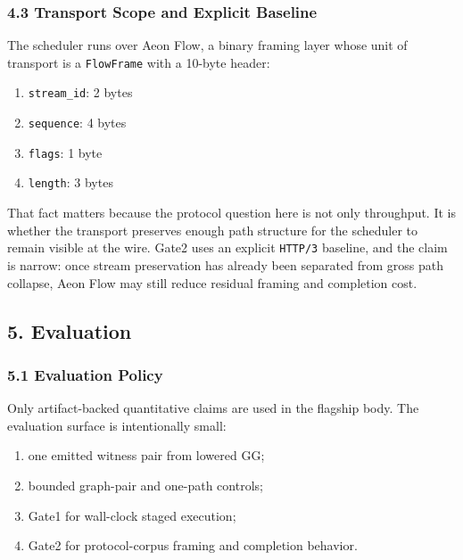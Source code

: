 \documentclass[
  11pt,
]{article}
\providecommand{\tightlist}{%
  \setlength{\itemsep}{0pt}\setlength{\parskip}{0pt}}
\begin{document}
\subsubsection{4.3 Transport Scope and Explicit
Baseline}\label{transport-scope-and-explicit-baseline}

The scheduler runs over Aeon Flow, a binary framing layer whose unit of
transport is a \texttt{FlowFrame} with a 10-byte header:

\begin{enumerate}
\def\labelenumi{\arabic{enumi}.}
\tightlist
\item
  \texttt{stream\_id}: 2 bytes
\item
  \texttt{sequence}: 4 bytes
\item
  \texttt{flags}: 1 byte
\item
  \texttt{length}: 3 bytes
\end{enumerate}

That fact matters because the protocol question here is not only
throughput. It is whether the transport preserves enough path structure
for the scheduler to remain visible at the wire. Gate2 uses an explicit
\texttt{HTTP/3} baseline, and the claim is narrow: once stream
preservation has already been separated from gross path collapse, Aeon
Flow may still reduce residual framing and completion cost.

\subsection{5. Evaluation}\label{evaluation}

\subsubsection{5.1 Evaluation Policy}\label{evaluation-policy}

Only artifact-backed quantitative claims are used in the flagship body.
The evaluation surface is intentionally small:

\begin{enumerate}
\def\labelenumi{\arabic{enumi}.}
\tightlist
\item
  one emitted witness pair from lowered GG;
\item
  bounded graph-pair and one-path controls;
\item
  Gate1 for wall-clock staged execution;
\item
  Gate2 for protocol-corpus framing and completion behavior.
\end{enumerate}
\end{document}
